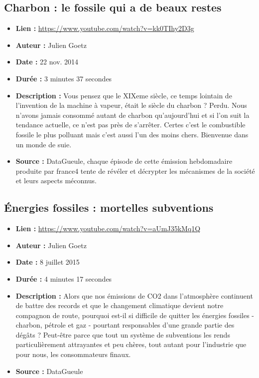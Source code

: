 \documentclass[8pt]{article}
\begin{document}
\subsection{Charbon : le fossile qui a de beaux restes}
\begin{itemize}
	\item \textbf{Lien : }  \url{https://www.youtube.com/watch?v=kk0TIhy2D3g} 
	\item \textbf{Auteur : } Julien Goetz
	\item \textbf{Date : } 22 nov. 2014
	\item \textbf{Durée : } 3 minutes 37 secondes
	\item \textbf{Description : } Vous pensez que le XIXeme siècle, ce temps lointain de l'invention de la machine à vapeur, était le siècle du charbon ? Perdu. Nous n'avons jamais consommé autant de charbon qu'aujourd'hui et si l'on suit la tendance actuelle, ce n'est pas près de s'arrêter. Certes c'est le combustible fossile le plus polluant mais c'est aussi l'un des moins chers. Bienvenue dans un monde de suie.
	\item \textbf{Source : } DataGueule, chaque épisode de cette émission hebdomadaire produite par france4 tente de révéler et décrypter les mécanismes de la société et leurs aspects méconnus.
\end{itemize}

\subsection{Énergies fossiles : mortelles subventions}
\begin{itemize}
	\item \textbf{Lien : }  \url{https://www.youtube.com/watch?v=aUmJ35kMq1Q} 
	\item \textbf{Auteur : } Julien Goetz
	\item \textbf{Date : } 8 juillet 2015
	\item \textbf{Durée : } 4 minutes 17 secondes
	\item \textbf{Description : } Alors que nos émissions de CO2 dans l'atmosphère continuent de battre des records et que le changement climatique devient notre compagnon de route, pourquoi est-il si difficile de quitter les énergies fossiles - charbon, pétrole et gaz - pourtant responsables d'une grande partie des dégâts ? Peut-être parce que tout un système de subventions les rends particulièrement attrayantes et peu chères, tout autant pour l'industrie que pour nous, les consommateurs finaux. 
	\item \textbf{Source : } DataGueule
\end{itemize}
\end{document}
